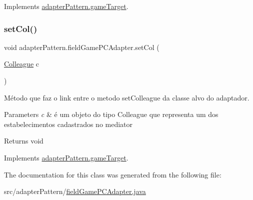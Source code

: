 Implements \mbox{\hyperlink{interfaceadapter_pattern_1_1game_target_a9ea61c0d011aa457f9a8c887d086044a}{adapter\+Pattern.\+game\+Target}}.

\mbox{\label{classadapter_pattern_1_1field_game_p_c_adapter_a628eaa84c2864e5a3965a713665bd802}} 
\subsubsection{\texorpdfstring{setCol()}{setCol()}}
{\footnotesize\ttfamily void adapter\+Pattern.\+field\+Game\+P\+C\+Adapter.\+set\+Col (\begin{DoxyParamCaption}\item[{\mbox{\hyperlink{classmediator_pattern_1_1_colleague}{Colleague}}}]{c }\end{DoxyParamCaption})}



Método que faz o link entre o metodo set\+Colleague da classe alvo do adaptador. 


\begin{DoxyParams}{Parameters}
{\em c} & é um objeto do tipo Colleague que representa um dos estabelecimentos cadastrados no mediator \\
\hline
\end{DoxyParams}
\begin{DoxyReturn}{Returns}
void 
\end{DoxyReturn}


Implements \mbox{\hyperlink{interfaceadapter_pattern_1_1game_target_ae4493af8f85c0459e4e628ffff3fe3b9}{adapter\+Pattern.\+game\+Target}}.



The documentation for this class was generated from the following file\+:\begin{DoxyCompactItemize}
\item 
src/adapter\+Pattern/\mbox{\hyperlink{field_game_p_c_adapter_8java}{field\+Game\+P\+C\+Adapter.\+java}}\end{DoxyCompactItemize}
